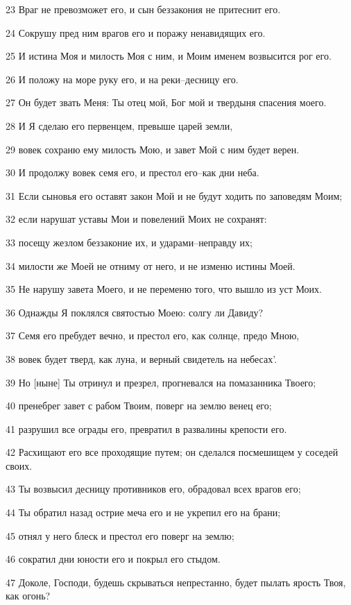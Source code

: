 \par 23 Враг не превозможет его, и сын беззакония не притеснит его.
\par 24 Сокрушу пред ним врагов его и поражу ненавидящих его.
\par 25 И истина Моя и милость Моя с ним, и Моим именем возвысится рог его.
\par 26 И положу на море руку его, и на реки--десницу его.
\par 27 Он будет звать Меня: Ты отец мой, Бог мой и твердыня спасения моего.
\par 28 И Я сделаю его первенцем, превыше царей земли,
\par 29 вовек сохраню ему милость Мою, и завет Мой с ним будет верен.
\par 30 И продолжу вовек семя его, и престол его--как дни неба.
\par 31 Если сыновья его оставят закон Мой и не будут ходить по заповедям Моим;
\par 32 если нарушат уставы Мои и повелений Моих не сохранят:
\par 33 посещу жезлом беззаконие их, и ударами--неправду их;
\par 34 милости же Моей не отниму от него, и не изменю истины Моей.
\par 35 Не нарушу завета Моего, и не переменю того, что вышло из уст Моих.
\par 36 Однажды Я поклялся святостью Моею: солгу ли Давиду?
\par 37 Семя его пребудет вечно, и престол его, как солнце, предо Мною,
\par 38 вовек будет тверд, как луна, и верный свидетель на небесах'.
\par 39 Но [ныне] Ты отринул и презрел, прогневался на помазанника Твоего;
\par 40 пренебрег завет с рабом Твоим, поверг на землю венец его;
\par 41 разрушил все ограды его, превратил в развалины крепости его.
\par 42 Расхищают его все проходящие путем; он сделался посмешищем у соседей своих.
\par 43 Ты возвысил десницу противников его, обрадовал всех врагов его;
\par 44 Ты обратил назад острие меча его и не укрепил его на брани;
\par 45 отнял у него блеск и престол его поверг на землю;
\par 46 сократил дни юности его и покрыл его стыдом.
\par 47 Доколе, Господи, будешь скрываться непрестанно, будет пылать ярость Твоя, как огонь?
